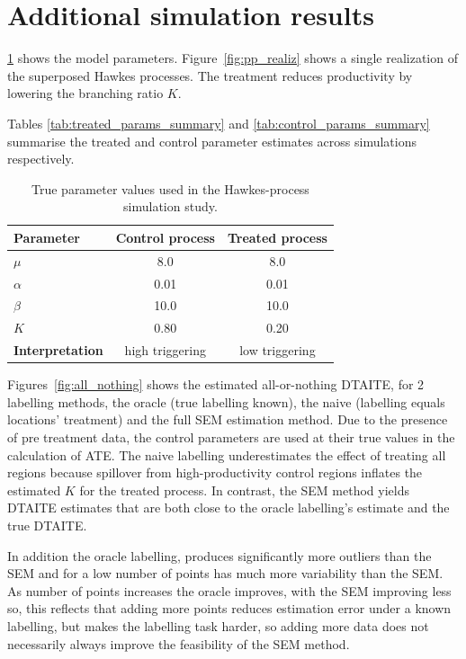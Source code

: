 \documentclass{statsoc}
\newcommand{\1}{\mathbbm{1}}
\begin{document}
\section{Additional simulation results}\label{app:additional_simulation}
\cref{tab:sim-true-values} shows the model parameters. Figure~\ref{fig:pp_realiz} shows a single realization of the superposed Hawkes processes. The treatment reduces productivity by lowering the branching ratio $K$. 

Tables \ref{tab:treated_params_summary} and \ref{tab:control_params_summary} summarise the treated and control parameter estimates across simulations respectively.

\begin{table}
\centering
\begin{minipage}{\textwidth} %
\centering
\begin{tabular}{lcc}
\toprule
Parameter & Control process & Treated process \\
\midrule
$\mu$     & 8.0  & 8.0  \\
$\alpha$  & 0.01 & 0.01 \\
$\beta$   & 10.0 & 10.0 \\
$K$       & 0.80 & 0.20 \\
\midrule
\textbf{Interpretation} & high triggering & low triggering \\
\bottomrule
\end{tabular}
\caption{True parameter values used in the Hawkes-process simulation study.}
\label{tab:sim-true-values}
\end{minipage}
\end{table}


Figures~\ref{fig:all_nothing} shows the estimated all-or-nothing DTAITE, for 2 labelling methods, the oracle (true labelling known), the naive (labelling equals locations' treatment) and the full SEM estimation method. Due to the presence of pre treatment data, the control parameters are used at their true values in the calculation of ATE. The naive labelling underestimates the effect of treating all regions because spillover from high-productivity control regions inflates the estimated $K$ for the treated process. In contrast, the SEM method yields DTAITE estimates that are both close to the oracle labelling's estimate and the true DTAITE.

In addition the oracle labelling, produces significantly more outliers than the SEM and for a low number of points has much more variability than the SEM. As number of points increases the oracle improves, with the SEM improving less so, this reflects that adding more points reduces estimation error under a known labelling, but makes the labelling task harder, so adding more data does not necessarily always improve the feasibility of the SEM method.
\end{document}
